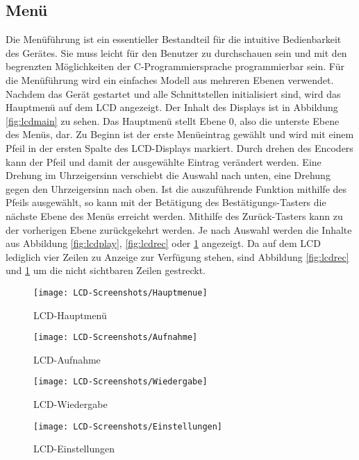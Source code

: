 \subsection{Menü}
Die Menüführung ist ein essentieller Bestandteil für die intuitive Bedienbarkeit des Gerätes. Sie muss leicht für den Benutzer zu durchschauen sein und mit den begrenzten Möglichkeiten der C-Programmiersprache programmierbar sein. Für die Menüführung wird ein einfaches Modell aus mehreren Ebenen verwendet. Nachdem das Gerät gestartet und alle Schnittstellen initialisiert sind, wird das Hauptmenü auf dem LCD angezeigt. Der Inhalt des Displays ist in Abbildung \ref{fig:lcdmain} zu sehen. Das Hauptmenü stellt Ebene 0, also die unterste Ebene des Menüs, dar. Zu Beginn ist der erste Menüeintrag gewählt und wird mit einem Pfeil in der ersten Spalte des LCD-Displays markiert. Durch drehen des Encoders kann der Pfeil und damit der ausgewählte Eintrag verändert werden. Eine Drehung im Uhrzeigersinn verschiebt die Auswahl nach unten, eine Drehung gegen den Uhrzeigersinn nach oben. Ist die auszuführende Funktion mithilfe des Pfeils ausgewählt, so kann mit der Betätigung des Bestätigungs-Tasters die nächste Ebene des Menüs erreicht werden. Mithilfe des Zurück-Tasters kann zu der vorherigen Ebene zurückgekehrt werden. Je nach Auswahl werden die Inhalte aus Abbildung \ref{fig:lcdplay}, \ref{fig:lcdrec} oder \ref{fig:lcdset} angezeigt. Da auf dem LCD lediglich vier Zeilen zu Anzeige zur Verfügung stehen, sind Abbildung \ref{fig:lcdrec} und \ref{fig:lcdset} um die nicht sichtbaren Zeilen gestreckt. 
\begin{figure}[h]
	\begin{minipage}{.22\linewidth}
		\centering
		\texttt{[image: LCD-Screenshots/Hauptmenue]}
		\caption{LCD-Hauptmenü}
		\label{fig:lcdmain}
	\end{minipage}
	\hfill
	\begin{minipage}{.22\linewidth}
		\centering
		\texttt{[image: LCD-Screenshots/Aufnahme]}
		\caption{LCD-Aufnahme}
		\label{fig:lcdrec}
	\end{minipage}
	\hfill
	\begin{minipage}{.22\linewidth}
		\centering
		\texttt{[image: LCD-Screenshots/Wiedergabe]}
		\caption{LCD-Wiedergabe}
		\label{fig:lcdplay}
	\end{minipage}
	\hfill
	\begin{minipage}{.22\linewidth}
		\centering
		\texttt{[image: LCD-Screenshots/Einstellungen]}
		\caption{LCD-Einstellungen}
		\label{fig:lcdset}
	\end{minipage}
\end{figure}
